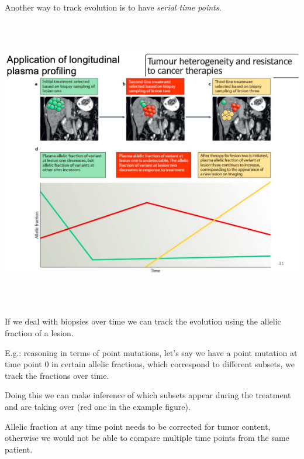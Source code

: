 Another way to track evolution is to have \emph{serial time points.}

\includegraphics[width=6.68889in,height=5.05486in]{image16.png}

If we deal with biopsies over time we can track the evolution using the allelic
fraction of a lesion.

E.g.: reasoning in terms of point mutations, let's say we have a point mutation
at time point 0 in certain allelic fractions, which correspond to different
subsets, we track the fractions over time.

Doing this we can make inference of which subsets appear during the treatment
and are taking over (red one in the example figure).

Allelic fraction at any time point needs to be corrected for tumor content,
otherwise we would not be able to compare multiple time points from the same
patient.
